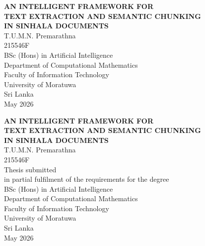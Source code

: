 \documentclass[12pt,a4paper,oneside]{report}
\begin{document}

\begin{titlepage}
    \centering
    \vspace*{1in}

    {\textbf{AN INTELLIGENT FRAMEWORK FOR\\
    TEXT EXTRACTION AND SEMANTIC CHUNKING\\
    IN SINHALA DOCUMENTS}}\\[2cm]

    {T.U.M.N. Premarathna}\\[0.5cm]
    {215546F}\\[3cm]

    {BSc (Hons) in Artificial Intelligence}\\[0.5cm]
    {Department of Computational Mathematics}\\[0.5cm]
    {Faculty of Information Technology}\\[0.5cm]
    {University of Moratuwa}\\[0.5cm]
    {Sri Lanka}\\[1.5cm]

    {May 2026}
    \vfill
\end{titlepage}

\begin{titlepage}
    \centering
    \vspace*{1in}

    {\textbf{AN INTELLIGENT FRAMEWORK FOR\\
    TEXT EXTRACTION AND SEMANTIC CHUNKING\\
    IN SINHALA DOCUMENTS}}\\[2cm]

    {T.U.M.N. Premarathna}\\[0.5cm]
    {215546F}\\[1.5cm]

    Thesis submitted\\
    in partial fulfilment of the requirements for the degree\\[1.5cm]

    {BSc (Hons) in Artificial Intelligence}\\[0.5cm]
    {Department of Computational Mathematics}\\[0.5cm]
    {Faculty of Information Technology}\\[0.5cm]
    {University of Moratuwa}\\[0.5cm]
    {Sri Lanka}\\[1.5cm]

    {May 2026}
    \vfill
\end{titlepage}
\end{document}

